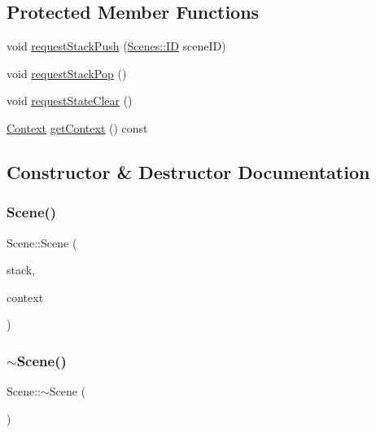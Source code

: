 \subsection*{Protected Member Functions}
\begin{DoxyCompactItemize}
\item 
void \hyperlink{class_scene_a38d36125a421eab649188edb740d1c36}{request\+Stack\+Push} (\hyperlink{namespace_scenes_a0ad7ab6856b1d77d498e3a251f6bb275}{Scenes\+::\+ID} scene\+ID)
\item 
void \hyperlink{class_scene_ad2f2093a8adc09c11e89cda6f94a3dd1}{request\+Stack\+Pop} ()
\item 
void \hyperlink{class_scene_a0cc91a92f27ba281b52c58168b7a000a}{request\+State\+Clear} ()
\item 
\hyperlink{struct_scene_1_1_context}{Context} \hyperlink{class_scene_acab4ecf24b21ffa8e423a8e4fd45c491}{get\+Context} () const
\end{DoxyCompactItemize}


\subsection{Constructor \& Destructor Documentation}
\mbox{\label{class_scene_a9834819a1140a2c066024927e6dc9692}} 
\subsubsection{\texorpdfstring{Scene()}{Scene()}}
{\footnotesize\ttfamily Scene\+::\+Scene (\begin{DoxyParamCaption}\item[{\hyperlink{class_scene_stack}{Scene\+Stack} \&}]{stack,  }\item[{\hyperlink{struct_scene_1_1_context}{Context}}]{context }\end{DoxyParamCaption})}

\mbox{\label{class_scene_a3b8cec2e32546713915f8c6303c951f1}} 
\subsubsection{\texorpdfstring{$\sim$\+Scene()}{~Scene()}}
{\footnotesize\ttfamily Scene\+::$\sim$\+Scene (\begin{DoxyParamCaption}{ }\end{DoxyParamCaption})\hspace{0.3cm}{\ttfamily [virtual]}}



